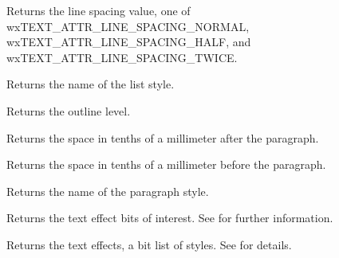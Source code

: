 
Returns the line spacing value, one of wxTEXT\_ATTR\_LINE\_SPACING\_NORMAL,
wxTEXT\_ATTR\_LINE\_SPACING\_HALF, and wxTEXT\_ATTR\_LINE\_SPACING\_TWICE.

\label{wxtextattrexgetliststylename}


Returns the name of the list style.

\label{wxtextattrexgetoutlinelevel}


Returns the outline level.

\label{wxtextattrexgetparagraphspacingafter}


Returns the space in tenths of a millimeter after the paragraph.

\label{wxtextattrexgetparagraphspacingbefore}


Returns the space in tenths of a millimeter before the paragraph.

\label{wxtextattrexgetparagraphstylename}


Returns the name of the paragraph style.

\label{wxtextattrexgettexteffectflags}


Returns the text effect bits of interest. See  for further information.

\label{wxtextattrexgettexteffects}


Returns the text effects, a bit list of styles. See  for
details.

\label{wxtextattrexgeturl}

